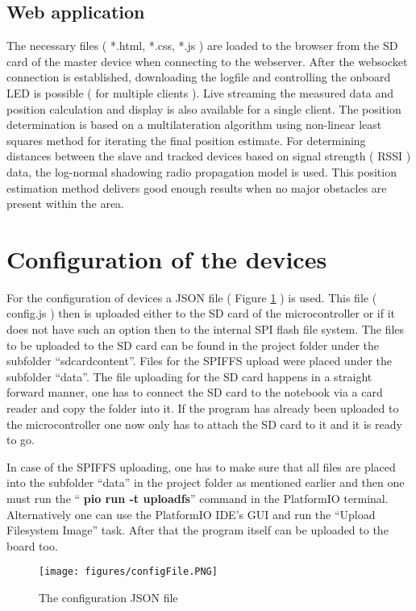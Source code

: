 \documentclass[11pt,a4paper]{article}
\begin{document}
\subsection{Web application}
The necessary files ( *.html, *.css, *.js ) are loaded to the browser from the SD card of the master device when connecting to the webserver. After the websocket connection is established, downloading the logfile and controlling the onboard LED is possible ( for multiple clients ). Live streaming the measured data and position calculation and display is also available for a single client. The position determination is based on a multilateration algorithm using non-linear least squares method for iterating the final position estimate. For determining distances between the slave and tracked devices based on signal strength ( RSSI ) data, the log-normal shadowing radio propagation model is used. This position estimation method delivers good enough results when no major obstacles are present within the area.


\section{Configuration of the devices}

For the configuration of devices a JSON file ( Figure \ref{fig:config} ) is used. This file ( config.js ) then is uploaded either to the SD card of the microcontroller or if it does not have such an option then to the internal SPI flash file system. The files to be uploaded to the SD card can be found in the project folder under the subfolder ``sdcardcontent''. Files for the SPIFFS upload were placed under the subfolder ``data''. The file uploading for the SD card happens in a straight forward manner, one has to connect the SD card to the notebook via a card reader and copy the folder into it. If the program has already been uploaded to the microcontroller one now only has to attach the SD card to it and it is ready to go.

In case of the SPIFFS uploading, one has to make sure that all files are placed into the subfolder ``data'' in the project folder as mentioned earlier and then one must run the ``{\selectfont
\textbf{pio run -t uploadfs}}'' command in the PlatformIO terminal. Alternatively one can use the PlatformIO IDE's GUI and run the ``Upload Filesystem Image'' task. After that the program itself can be uploaded to the board too.

\begin{figure}[H]
    \centering
    \texttt{[image: figures/configFile.PNG]}
    \caption{The configuration JSON file}
    \label{fig:config}
\end{figure}
\end{document}
